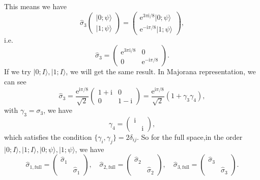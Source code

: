 \documentclass{book}
\begin{document}
This means we have
\begin{equation*}
\hat{\sigma }_{3}\begin{pmatrix}
|0;\psi \rangle \\
|1;\psi \rangle 
\end{pmatrix} =\begin{pmatrix}
\mathrm{e}^{3\pi \mathrm{i} /8} |0;\psi \rangle \\
\mathrm{e}^{-\mathrm{i} \pi /8} |1;\psi \rangle 
\end{pmatrix} ,
\end{equation*}
i.e.
\begin{equation*}
\hat{\sigma }_{3} =\begin{pmatrix}
\mathrm{e}^{3\pi \mathrm{i} /8} & 0\\
0 & \mathrm{e}^{-\mathrm{i} \pi /8}
\end{pmatrix} .
\end{equation*}
If we try $|0;I \rangle ,|1;I \rangle $, we will get the same result. In Majorana representation, we can see
\begin{equation*}
\hat{\sigma }_{3} =\frac{\mathrm{e}^{\mathrm{i} \pi /8}}{\sqrt{2}}\begin{pmatrix}
1+\mathrm{i} & 0\\
0 & 1-\mathrm{i}
\end{pmatrix} =\frac{\mathrm{e}^{\mathrm{i} \pi /8}}{\sqrt{2}}( 1+\gamma _{3} \gamma _{4}) ,
\end{equation*}
with $\gamma _{3} =\sigma _{3}$, we have
\begin{equation*}
\gamma _{4} =\begin{pmatrix}
\mathrm{i} & \\
 & \mathrm{i}
\end{pmatrix} ,
\end{equation*}
which satisfies the condition $\{\gamma _{i} ,\gamma _{j}\} =2\delta _{ij}$. So for the full space,in the order $|0;I \rangle ,|1;I \rangle ,|0;\psi \rangle ,|1;\psi \rangle $, we have
\begin{equation*}
\hat{\sigma }_{1,\text{full}} =\begin{pmatrix}
\hat{\sigma }_{1} & \\
 & \hat{\sigma }_{1}
\end{pmatrix} ,\quad \hat{\sigma }_{2,\text{full}} =\begin{pmatrix}
\hat{\sigma }_{2} & \\
 & \hat{\sigma }_{2}
\end{pmatrix} ,\quad \hat{\sigma }_{3,\text{full}} =\begin{pmatrix}
\hat{\sigma }_{3} & \\
 & \hat{\sigma }_{3}
\end{pmatrix} .
\end{equation*}
\end{document}
